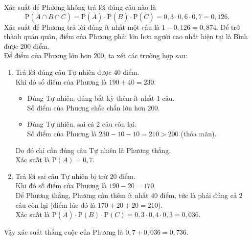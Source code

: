 \begin{ex}
{\begin{itemchoice}
			\itemch Xác suất để Phương không trả lời đúng câu nào là \[\mathrm{P}\left(\overline{A}\cap\overline{B}\cap\overline{C}\right)=\mathrm{P}\left(\overline{A}\right)\cdot\mathrm{P}\left(\overline{B}\right)\cdot\mathrm{P}\left(\overline{C}\right) = 0{,}3 \cdot 0{,}6 \cdot 0{,}7 = 0{,}126.\]
			Xác suất để Phương trả lời đúng ít nhất một câu là $1 - 0{,}126 = 0{,}874$.
			\itemch Để trở thành quán quân, điểm của Phương phải lớn hơn người cao nhất hiện tại là Bình được $200$ điểm.\\
			Để điểm của Phương lớn hơn $200$, ta xét các trường hợp sau:
			\begin{enumerate}[\it TH 1:]
				\item Trả lời đúng câu Tự nhiên được $40$ điểm.\\
				Khi đó số điểm của Phương là $190+40=230$.
				\begin{itemize}
					\item  Đúng Tự nhiên, đúng bất kỳ thêm ít nhất $1$ câu.\\
					Số điểm của Phương chắc chắn lớn hơn $200$.
					\item  Đúng Tự nhiên, sai cả $2$ câu còn lại.\\
					Số điểm của Phương là $230-10-10 = 210 > 200$ (thỏa mãn).
				\end{itemize}
				Do đó chỉ cần đúng câu Tự nhiên là Phương thắng.\\
				Xác suất là $\mathrm{P}(A) = 0{,}7$.
				\item Trả lời sai câu Tự nhiên bị trừ $20$ điểm.\\
				Khi đó số điểm của Phương là $190-20=170$. \\
				Để Phương thắng, Phương cần thêm ít nhất $40$ điểm, tức là phải đúng cả $2$ câu còn lại (điểm lúc đó là $170+20+20=210$). \\
				Xác suất là $\mathrm{P}\left(\overline{A}\right) \cdot \mathrm{P}(B) \cdot \mathrm{P}(C) = 0{,}3 \cdot 0{,}4 \cdot 0{,}3 = 0{,}036$.
			\end{enumerate}
			Vậy xác suất thắng cuộc của Phương là $0{,}7 + 0{,}036 = 0{,}736$.
		\end{itemchoice}
	}
\end{ex}

